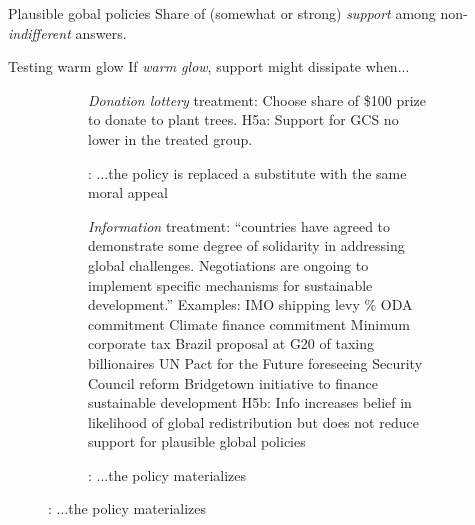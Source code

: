 \documentclass[aspectratio=169,xcolor=dvipsnames, 11pt,mathserif]{beamer}
\begin{document}
\begin{frame}{Plausible gobal policies\label{solidarity_support_relative}}
\centering Share of (somewhat or strong) \textit{support} among non-\textit{indifferent} answers. \quad {} \hyperlink{solidarity_support_absolute}{} \\
\end{frame}

\begin{frame}{Testing warm glow} 
  \centering If \textit{warm glow}, support might dissipate when...
    \begin{figure}
\begin{subfigure}{.38\textwidth}
  \caption[]{\normalsize {}: ...the policy is replaced a substitute with the same moral appeal}
  \bbvs \ip \textit{Donation lottery} treatment: Choose share of \$100 prize to donate to plant trees.
  \ip H5a: Support for GCS no lower in the treated group.
  \ee
  \vspace{3.8cm}
\end{subfigure} \quad \pause
\begin{subfigure}{.59\textwidth}
  \caption[]{\normalsize {}: ...the policy materializes} \vspace{-.5cm}
  \bbvs \ip \textit{Information} treatment: ``countries have agreed to demonstrate some degree of solidarity in addressing global challenges.  Negotiations are ongoing to implement specific mechanisms for sustainable development.'' Examples:
  \bbvs \ip IMO shipping levy
  \% ODA commitment
  \ip Climate finance commitment
  \ip Minimum corporate tax
  \ip Brazil proposal at G20 of taxing billionaires
  \ip UN Pact for the Future foreseeing Security Council reform
  \ip Bridgetown initiative to finance sustainable development
  \ee
  \ip H5b: Info increases belief in likelihood of global redistribution but does not reduce support for plausible global policies
  \ee
\end{subfigure}
\end{figure}
\end{frame}
\end{document}
